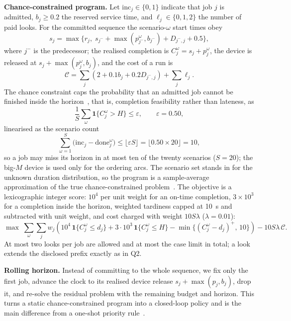 \documentclass{swmcmthesis}
\begin{document}
\textbf{Chance-constrained program.} Let $\mathrm{inc}_j\in\{0,1\}$ indicate that job $j$ is admitted, $b_j\ge0.2$ the reserved service time, and $\ell_j\in\{0,1,2\}$ the number of paid looks. For the committed sequence the scenario-$\omega$ start times obey
\begin{equation}
s_{j}= \max\{r_j,\; s_{j^-}+\max(p_{j^-}^{\omega},b_{j^-})+D_{j^-,j}+0.5\},
\end{equation}
where $j^-$ is the predecessor; the realised completion is $C_j^{\omega}=s_j+p_j^{\omega}$, the device is released at $s_j+\max(p_j^{\omega},b_j)$, and the cost of a run is
\begin{equation}
\mathcal{C}=\sum_j\left(2+0.1b_j+0.2D_{j^-,j}\right)+\sum_j \ell_j .
\end{equation}
The chance constraint caps the probability that an admitted job cannot be finished inside the horizon~\cite{ref5}, that is, completion feasibility rather than lateness, as
\begin{equation}
\frac1S\sum_{\omega}\mathbf 1\{C_j^{\omega}>H\}\le \varepsilon,\qquad \varepsilon=0.50,
\end{equation}
linearised as the scenario count
\begin{equation}
\textstyle\sum_{\omega=1}^{S}\bigl(\mathrm{inc}_j-\mathrm{done}_j^{\omega}\bigr)\le \lfloor \varepsilon S\rfloor = \lfloor 0.50\times 20\rfloor = 10,
\end{equation}
so a job may miss its horizon in at most ten of the twenty scenarios ($S=20$); the big-$M$ device is used only for the ordering arcs. The scenario set stands in for the unknown duration distribution, so the program is a sample-average approximation of the true chance-constrained problem~\cite{ref7}. The objective is a lexicographic integer score: $10^4$ per unit weight for an on-time completion, $3\times10^3$ for a completion inside the horizon, weighted tardiness capped at 10~s and subtracted with unit weight, and cost charged with weight $10S\lambda$ ($\lambda=0.01$):
\begin{equation}
\max\;\sum_{\omega}\sum_j w_j\left(10^4\,\mathbf 1\{C_j^{\omega}\le d_j\}+3\cdot10^3\,\mathbf 1\{C_j^{\omega}\le H\}-\min\{(C_j^{\omega}-d_j)^+,\,10\}\right)-10S\lambda\,\mathcal{C}.
\end{equation}
At most two looks per job are allowed and at most the case limit in total; a look extends the disclosed prefix exactly as in Q2.

\textbf{Rolling horizon.} Instead of committing to the whole sequence, we fix only the first job, advance the clock to its realised device release $s_j+\max(p_j,b_j)$, drop it, and re-solve the residual problem with the remaining budget and horizon. This turns a static chance-constrained program into a closed-loop policy and is the main difference from a one-shot priority rule~\cite{ref6}.
\end{document}
